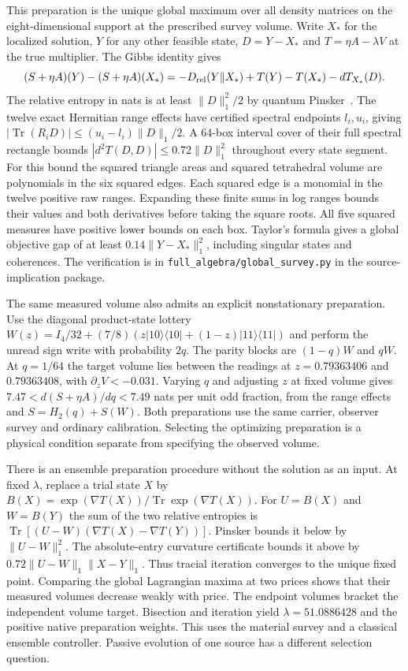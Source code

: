 \documentclass[11pt]{article}
\begin{document}
This preparation is the unique global maximum over all density
matrices on the eight-dimensional support at the prescribed survey
volume. Write $X_*$ for the localized solution, $Y$ for any other
feasible state, $D=Y-X_*$ and $T=\eta A-\lambda V$ at the true
multiplier. The Gibbs identity gives
\[
 (S+\eta A)(Y)-(S+\eta A)(X_*)=
 -D_{\rm rel}(Y\|X_*)+T(Y)-T(X_*)-dT_{X_*}(D).
\]
The relative entropy in nats is at least $\|D\|_1^2/2$ by quantum
Pinsker~\cite{carlen2016pinsker}. The twelve exact Hermitian range effects have certified
spectral endpoints $l_i,u_i$, giving
$|\operatorname{Tr}(R_i D)|\le (u_i-l_i)\|D\|_1/2$.
A 64-box interval cover of their full spectral rectangle bounds
$|d^2T(D,D)|\le 0.72\|D\|_1^2$ throughout every state segment.
For this bound the squared triangle areas and squared tetrahedral
volume are polynomials in the six squared edges. Each squared edge
is a monomial in the twelve positive raw ranges. Expanding these
finite sums in log ranges bounds their values and both derivatives
before taking the square roots. All five squared measures have
positive lower bounds on each box.
Taylor's formula gives a global objective gap of at least
$0.14\|Y-X_*\|_1^2$, including singular states and coherences.
The verification is in \texttt{full\_algebra/global\_survey.py}
in the source-implication package.

The same measured volume also admits an explicit nonstationary preparation.
Use the diagonal product-state lottery
$W(z)=I_4/32+(7/8)(z|10\rangle\langle10|+(1-z)|11\rangle\langle11|)$
and perform the unread sign write with probability $2q$. The
parity blocks are $(1-q)W$ and $qW$. At $q=1/64$ the target volume lies
between the readings at $z=0.79363406$ and $0.79363408$,
with $\partial_z V<-0.031$. Varying $q$ and adjusting $z$ at fixed
volume gives $7.47<d(S+\eta A)/dq<7.49$ nats per unit odd fraction,
from the range effects and $S=H_2(q)+S(W)$.
Both preparations use the same carrier, observer survey and ordinary
calibration. Selecting the optimizing preparation is a physical
condition separate from specifying the observed volume.

There is an ensemble preparation procedure without the solution as an
input. At fixed $\lambda$, replace a trial state $X$ by
$B(X)=\exp(\nabla T(X))/\operatorname{Tr}\exp(\nabla T(X))$.
For $U=B(X)$ and $W=B(Y)$ the sum of the two relative entropies is
$\operatorname{Tr}[(U-W)(\nabla T(X)-\nabla T(Y))]$. Pinsker bounds
it below by $\|U-W\|_1^2$. The absolute-entry curvature certificate
bounds it above by $0.72\|U-W\|_1\|X-Y\|_1$. Thus tracial iteration
converges to the unique fixed point. Comparing the global Lagrangian
maxima at two prices shows that their measured volumes decrease
weakly with price. The endpoint volumes bracket the independent
volume target. Bisection and iteration yield $\lambda=51.0886428$
and the positive native preparation weights. This uses the material
survey and a classical ensemble controller. Passive evolution of one
source has a different selection question.
\end{document}
